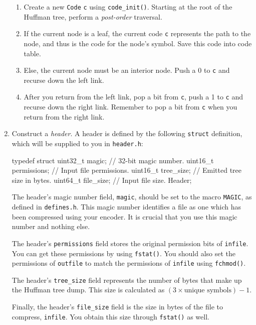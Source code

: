 \begin{enumerate}
    \begin{enumerate}
    \item Create a new \texttt{Code} \texttt{c} using \texttt{code\_init()}.
        Starting at the root of the Huffman tree, perform a
        \emph{post-order} traversal.
      \item If the current node is a leaf, the current code \texttt{c}
        represents the path to the node, and thus is the code for the
        node's symbol. Save this code into code table.
      \item Else, the current node must be an interior node. Push a 0 to
        \texttt{c} and recurse down the left link.
      \item After you return from the left link, pop a bit from
        \texttt{c}, push a 1 to \texttt{c} and recurse down the right
        link. Remember to pop a bit from \texttt{c} when you return from
        the right link.
      \end{enumerate}

  \item Construct a \emph{header}. A header is defined by the following
    \texttt{struct} definition, which will be supplied to you in
    \texttt{header.h}:
    \begin{clisting}{}
typedef struct {
    uint32_t magic;       // 32-bit magic number.
    uint16_t permissions; // Input file permissions.
    uint16_t tree_size;   // Emitted tree size in bytes.
    uint64_t file_size;   // Input file size.
} Header;
    \end{clisting}

    The header's magic number field, \texttt{magic}, should be set to
    the macro \texttt{MAGIC}, as defined in \texttt{defines.h}. This
    magic number identifies a file as one which has been compressed
    using your encoder. It is crucial that you use this magic number and
    nothing else.

    The header's \texttt{permissions} field stores the original
    permission bits of \texttt{infile}. You can get these permissions by
    using \texttt{fstat()}. You should also set the permissions of
    \texttt{outfile} to match the permissions of \texttt{infile} using
    \texttt{fchmod()}.

    The header's \texttt{tree\_size} field represents the number of
    bytes that make up the Huffman tree dump. This size is calculated as
    $(3 \times \text{unique symbols}) - 1$.

    Finally, the header's \texttt{file\_size} field is the size in bytes
    of the file to compress, \texttt{infile}. You obtain this size
    through \texttt{fstat()} as well.


\end{enumerate}
